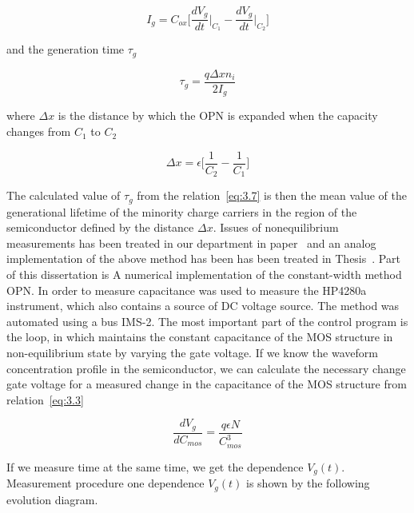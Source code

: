\begin{equation}\label{eq:3.6}
  I_g = C_{ox} \bigg[\frac{dV_g}{dt}\Big\rvert_{C_1} - \frac{dV_g}{dt}\Big\rvert_{C_2}\bigg]
\end{equation}

and the generation time $\tau_g$

\begin{equation}\label{eq:3.7}
  \tau_g = \frac{q\Delta x n_i}{2I_g}
\end{equation}

where $\Delta x$ is the distance by which the OPN is expanded when the
capacity changes from $C_1$ to $C_2$

\begin{equation}\label{eq:3.8}
  \Delta x = \epsilon \Big[\frac{1}{C_2} - \frac{1}{C_1}\Big]
\end{equation}

The calculated value of $\tau_g$ from the relation~\ref{eq:3.7} is
then the mean value of the generational lifetime of the minority
charge carriers in the region of the semiconductor defined by the
distance $\Delta x$.  Issues of nonequilibrium measurements has been
treated in our department in paper~\cite{1.6} and an analog
implementation of the above method has been has been treated in
Thesis~\cite{3.13}. Part of this dissertation is A numerical
implementation of the constant-width method OPN\@. In order to measure
capacitance was used to measure the HP4280a instrument, which also
contains a source of DC voltage source. The method was automated using
a bus IMS-2. The most important part of the control program is the
loop, in which maintains the constant capacitance of the MOS structure
in non-equilibrium state by varying the gate voltage.  If we know the
waveform concentration profile in the semiconductor, we can calculate
the necessary change gate voltage for a measured change in the
capacitance of the MOS structure from relation~\ref{eq:3.3}

\begin{equation}\label{eq:3.9}
  \frac{dV_g}{dC_{mos}} = \frac{q\epsilon N}{C^3_{mos}}
\end{equation}

If we measure time at the same time, we get the dependence
$V_g(t)$. Measurement procedure one dependence $V_g(t)$ is shown by
the following evolution diagram.

